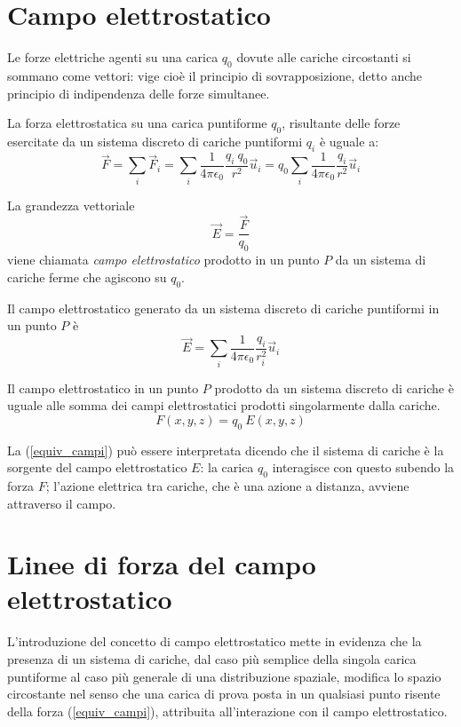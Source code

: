 \documentclass[class=book, crop=false, oneside, 12pt]{standalone}
\begin{document}
\section{Campo elettrostatico}

Le forze elettriche agenti su una carica \(q_0\) dovute alle cariche circostanti si sommano come vettori: vige cioè il principio di sovrapposizione, detto anche principio di indipendenza delle forze simultanee.

La forza elettrostatica su una carica puntiforme \(q_0\), risultante delle forze esercitate da un sistema discreto di cariche puntiformi \(q_i\) è uguale a: 
\begin{equation}
    \overrightarrow{F} = \sum_i \overrightarrow{F}_i = \sum_i \frac{1}{4 \pi \epsilon_0} \frac{q_i \ q_0}{r^2} \overrightarrow{u}_i = q_0 \sum_i \frac{1}{4 \pi \epsilon_0} \frac{q_i}{r^2} \overrightarrow{u}_i  
\end{equation}

La grandezza vettoriale
\begin{equation}
    \overrightarrow{E} = \frac{\overrightarrow{F}}{q_0}
\end{equation}
viene chiamata \emph{campo elettrostatico} prodotto in un punto \(P\) da un sistema di cariche ferme che agiscono su \(q_0\).

Il campo elettrostatico generato da un sistema discreto di cariche puntiformi in un punto \(P\) è
\begin{equation}
    \overrightarrow{E} =\sum_i \frac{1}{4 \pi \epsilon_0} \frac{q_i}{r_i^2} \overrightarrow{u}_i
\end{equation}

Il campo elettrostatico in un punto \(P\) prodotto da un sistema discreto di cariche è uguale alle somma dei campi elettrostatici prodotti singolarmente dalla cariche.
\begin{equation} \label{equiv_campi}
    F ( x, y, z) = q_0 \ E ( x, y, z) 
\end{equation}

La (\ref{equiv_campi}) può essere interpretata dicendo che il sistema di cariche è la sorgente del campo elettrostatico \(E\): la carica \(q_0\) interagisce con questo subendo la forza \(F\); 
l'azione elettrica tra cariche, che è una azione a distanza, avviene attraverso il campo. 

\section{Linee di forza del campo elettrostatico}
L'introduzione del concetto di campo elettrostatico mette in evidenza che la presenza di un sistema di cariche, dal caso più semplice della singola carica puntiforme al caso più generale di una distribuzione spaziale, modifica lo spazio circostante nel senso che una carica di prova posta in un qualsiasi punto risente della forza (\ref{equiv_campi}), attribuita all'interazione con il campo elettrostatico.
\end{document}
